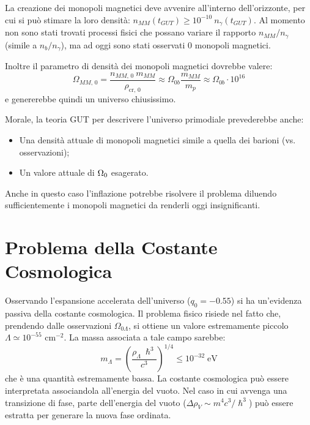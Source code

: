 La creazione dei monopoli magnetici deve avvenire all'interno dell'orizzonte, per cui si può stimare la loro densità: $n_{MM}(t_{GUT})\ge 10^{-10} ~n_\gamma(t_{GUT})$. Al momento non sono stati trovati processi fisici che possano variare il rapporto $n_{MM}/n_\gamma$ (simile a $n_b/n_\gamma$), ma ad oggi sono stati osservati 0 monopoli magnetici.

Inoltre il parametro di densità dei monopoli magnetici dovrebbe valere:
\begin{equation*}
    \Omega_{MM,\, 0} = \frac{n_{MM,\, 0} ~m_{MM}}{\rho_{\mathrm{cr},\, 0}} \approx \Omega_{0b}\frac{m_{MM}}{m_p}\approx \Omega_{0b} \cdot 10^{16}
\end{equation*}
e genererebbe quindi un universo chiusissimo.

\vspace{1em}
\noindent Morale, la teoria GUT per descrivere l'universo primodiale prevederebbe anche:
\begin{itemize}
    \item Una densità attuale di monopoli magnetici simile a quella dei barioni (vs. osservazioni);
    \item Un valore attuale di $\Omega_0$ esagerato.
\end{itemize}
Anche in questo caso l'inflazione potrebbe risolvere il problema diluendo sufficientemente i monopoli magnetici da renderli oggi insignificanti.

\newpage
\section{Problema della Costante Cosmologica}
Osservando l'espansione accelerata dell'universo ($q_0=-0.55$) si ha un'evidenza passiva della costante cosmologica. Il problema fisico risiede nel fatto che, prendendo dalle osservazioni $\Omega_{0\Lambda}$, si ottiene un valore estremamente piccolo $\Lambda\simeq 10^{-55}$ cm$^{-2}$. La massa associata a tale campo sarebbe:
$$
m_\Lambda = \left( \frac{\rho_\Lambda ~\hslash^3}{c^3}\right)^{1/4} \le 10^{-32}\; \mathrm{eV}
$$
che è una quantità estremamente bassa. La costante cosmologica può essere interpretata associandola all'energia del vuoto. Nel caso in cui avvenga una transizione di fase, parte dell'energia del vuoto ($\Delta \rho_V \sim m^4 c^3 / \hslash^3$) può essere estratta per generare la nuova fase ordinata.

